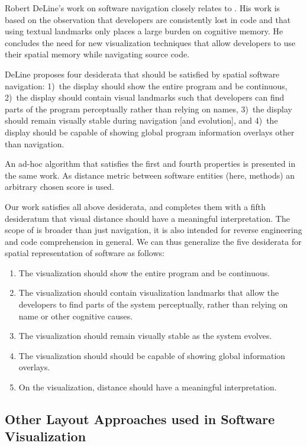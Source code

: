 Robert DeLine's work on software navigation \cite{Deli05b,Deli06a} closely relates to \SOCA. His work is based on the observation that developers are consistently lost in code \cite{Deli05a} and that using textual landmarks only places a large burden on cognitive memory. He concludes the need for new visualization techniques that allow developers to use their spatial memory while navigating source code.

DeLine proposes four desiderata \cite{Deli05b} that should be satisfied by spatial software navigation: 1)~the display should show the entire program and be continuous, 2)~the display should contain visual landmarks such that developers can find parts of the program perceptually rather than relying on names, 3)~the display should remain visually stable during navigation [and evolution], and 4)~the display should be capable of showing global program information overlays other than navigation.

An ad-hoc algorithm that satisfies the first and fourth properties is presented in the same work. As distance metric between software entities (here, methods) an arbitrary chosen score is used.

Our work satisfies all above desiderata, and completes them with a fifth desideratum that visual distance should have a meaningful interpretation. The scope of \SOCA is broader than just navigation, it is also intended for reverse engineering and code comprehension in general. We can thus generalize the five desiderata for spatial representation of software as follows:

\begin{enumerate}
\item The visualization should show the entire program and be continuous.
\item The visualization should contain visualization landmarks that allow the developers to find parts of the system perceptually, rather than relying on name or other cognitive causes. 
\item The visualization should remain visually stable as the system evolves. 
\item The visualization should should be capable of showing global information overlays.
\item On the visualization, distance should have a meaningful interpretation. 
\end{enumerate}

\subsection{Other Layout Approaches used in Software Visualization}

